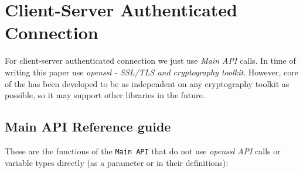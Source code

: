 %
%

\section{Client-Server Authenticated Connection}
\label{s:cs-auth-conn}

For client-server authenticated connection we just use \CANL
\textit{Main API} calls. In time of writing this paper 
\CANL use \textit{openssl - SSL/TLS and cryptography toolkit}. 
However, core of the \CANL has been developed to be as independent
 on any cryptography toolkit as possible, so it may support 
other libraries in the future.

\subsection{Main API Reference guide}
These are the functions of the \verb'Main API' that do not 
use \textit{openssl API} calls or variable types directly
 (as a parameter or in their definitions):

